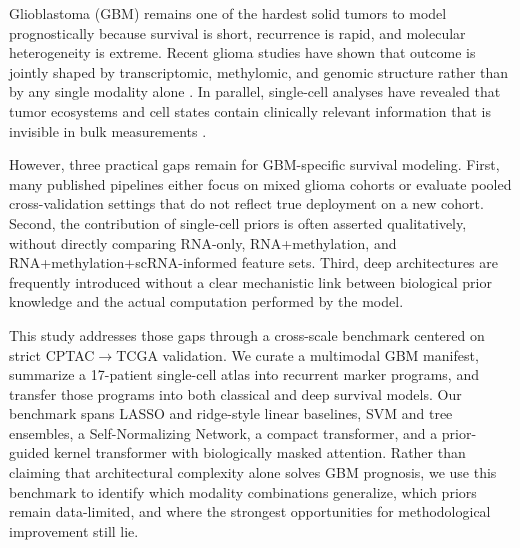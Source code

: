 Glioblastoma (GBM) remains one of the hardest solid tumors to model prognostically because survival is short, recurrence is rapid, and molecular heterogeneity is extreme. Recent glioma studies have shown that outcome is jointly shaped by transcriptomic, methylomic, and genomic structure rather than by any single modality alone \cite{li2025multiomics,piyadasa2026multiomic}. In parallel, single-cell analyses have revealed that tumor ecosystems and cell states contain clinically relevant information that is invisible in bulk measurements \cite{fan2025tme}.

However, three practical gaps remain for GBM-specific survival modeling. First, many published pipelines either focus on mixed glioma cohorts or evaluate pooled cross-validation settings that do not reflect true deployment on a new cohort. Second, the contribution of single-cell priors is often asserted qualitatively, without directly comparing RNA-only, RNA+methylation, and RNA+methylation+scRNA-informed feature sets. Third, deep architectures are frequently introduced without a clear mechanistic link between biological prior knowledge and the actual computation performed by the model.

This study addresses those gaps through a cross-scale benchmark centered on strict CPTAC$\rightarrow$TCGA validation. We curate a multimodal GBM manifest, summarize a 17-patient single-cell atlas into recurrent marker programs, and transfer those programs into both classical and deep survival models. Our benchmark spans LASSO and ridge-style linear baselines, SVM and tree ensembles, a Self-Normalizing Network, a compact transformer, and a prior-guided kernel transformer with biologically masked attention. Rather than claiming that architectural complexity alone solves GBM prognosis, we use this benchmark to identify which modality combinations generalize, which priors remain data-limited, and where the strongest opportunities for methodological improvement still lie.
